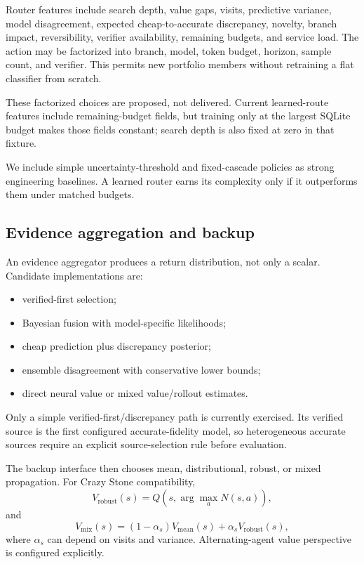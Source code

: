 \documentclass[10pt,twocolumn]{article}
\begin{document}
Router features include search depth, value gaps, visits, predictive variance,
model disagreement, expected cheap-to-accurate discrepancy, novelty, branch
impact, reversibility, verifier availability, remaining budgets, and service
load. The action may be factorized into branch, model, token budget, horizon,
sample count, and verifier. This permits new portfolio members without
retraining a flat classifier from scratch.

These factorized choices are proposed, not delivered. Current learned-route
features include remaining-budget fields, but training only at the largest
SQLite budget makes those fields constant; search depth is also fixed at zero
in that fixture.

We include simple uncertainty-threshold and fixed-cascade policies as strong
engineering baselines. A learned router earns its complexity only if it
outperforms them under matched budgets.

\subsection{Evidence aggregation and backup}

An evidence aggregator produces a return distribution, not only a scalar.
Candidate implementations are:

\begin{itemize}[leftmargin=1.2em,itemsep=0.15em,topsep=0.25em]
    \item verified-first selection;
    \item Bayesian fusion with model-specific likelihoods;
    \item cheap prediction plus discrepancy posterior;
    \item ensemble disagreement with conservative lower bounds;
    \item direct neural value or mixed value/rollout estimates.
\end{itemize}

Only a simple verified-first/discrepancy path is currently exercised. Its
verified source is the first configured accurate-fidelity model, so heterogeneous
accurate sources require an explicit source-selection rule before evaluation.

The backup interface then chooses mean, distributional, robust, or mixed
propagation. For Crazy Stone compatibility,
\[
V_{\mathrm{robust}}(s)
= Q\!\left(s,\arg\max_a N(s,a)\right),
\]
and
\[
V_{\mathrm{mix}}(s)
=(1-\alpha_s)V_{\mathrm{mean}}(s)
+\alpha_sV_{\mathrm{robust}}(s),
\]
where \(\alpha_s\) can depend on visits and variance. Alternating-agent value
perspective is configured explicitly.
\end{document}

